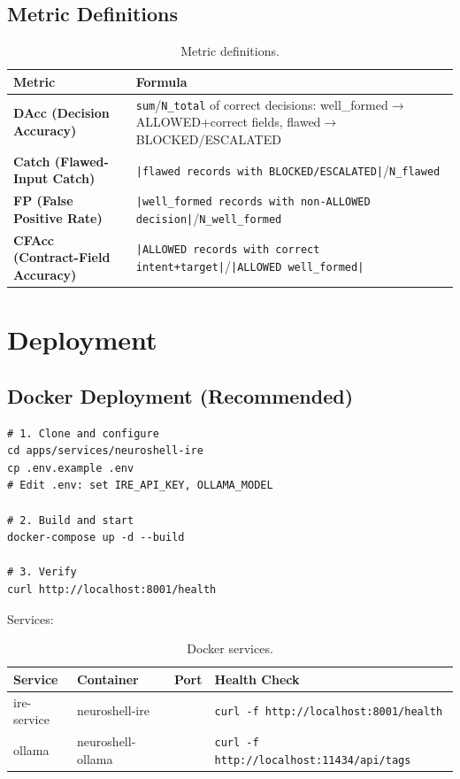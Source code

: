 \documentclass[10pt,journal,onecolumn]{IEEEtran}
\begin{document}
\subsection{Metric Definitions}
\begin{table}[h]
\caption{Metric definitions.}
\label{tab:metrics}
\begin{tabularx}{\columnwidth}{>{\bfseries}l X}
\toprule
\textbf{Metric} & \textbf{Formula}\\
\midrule
DAcc (Decision Accuracy) & \texttt{sum}/\texttt{N\_total} of correct decisions: well\_formed$\rightarrow$ALLOWED+correct fields, flawed$\rightarrow$BLOCKED/ESCALATED\\
Catch (Flawed-Input Catch) & \texttt{|flawed records with BLOCKED/ESCALATED|}/\texttt{N\_flawed}\\
FP (False Positive Rate) & \texttt{|well\_formed records with non-ALLOWED decision|}/\texttt{N\_well\_formed}\\
CFAcc (Contract-Field Accuracy) & \texttt{|ALLOWED records with correct intent+target|}/\texttt{|ALLOWED well\_formed|}\\
\bottomrule
\end{tabularx}
\end{table}
\section{Deployment}

\subsection{Docker Deployment (Recommended)}
\begin{lstlisting}
# 1. Clone and configure
cd apps/services/neuroshell-ire
cp .env.example .env
# Edit .env: set IRE_API_KEY, OLLAMA_MODEL

# 2. Build and start
docker-compose up -d --build

# 3. Verify
curl http://localhost:8001/health
\end{lstlisting}

Services:
\begin{table}[t]
\caption{Docker services.}
\label{tab:docker}
\begin{tabularx}{\textwidth}{>{\ttfamily}l >{\ttfamily}l >{\ttfamily}l >{\raggedright\arraybackslash}X}
\toprule
\textbf{Service} & \textbf{Container} & \textbf{Port} & \textbf{Health Check}\\
\midrule
ire-service & neuroshell-ire & 8001 & \texttt{curl -f http://localhost:8001/health}\\
ollama & neuroshell-ollama & 11434 & \texttt{curl -f http://localhost:11434/api/tags}\\
\bottomrule
\end{tabularx}
\end{table}
\end{document}
